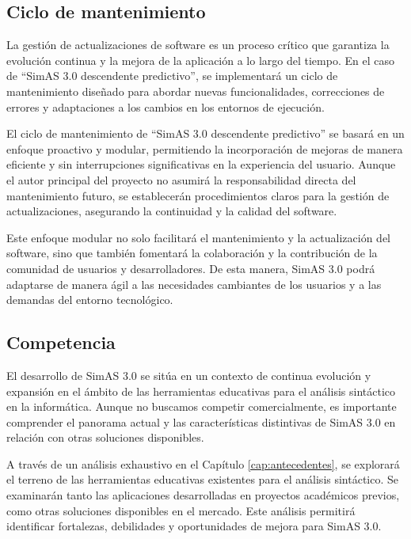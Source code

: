 \subsection{Ciclo de mantenimiento} \label{subsec:actualizaciones}

La gestión de actualizaciones de software es un proceso crítico que garantiza la evolución continua y la mejora de la aplicación a lo largo del tiempo. En el caso de ``SimAS 3.0 descendente predictivo'', se implementará un ciclo de mantenimiento diseñado para abordar nuevas funcionalidades, correcciones de errores y adaptaciones a los cambios en los entornos de ejecución.

El ciclo de mantenimiento de ``SimAS 3.0 descendente predictivo'' se basará en un enfoque proactivo y modular, permitiendo la incorporación de mejoras de manera eficiente y sin interrupciones significativas en la experiencia del usuario. Aunque el autor principal del proyecto no asumirá la responsabilidad directa del mantenimiento futuro, se establecerán procedimientos claros para la gestión de actualizaciones, asegurando la continuidad y la calidad del software.

Este enfoque modular no solo facilitará el mantenimiento y la actualización del software, sino que también fomentará la colaboración y la contribución de la comunidad de usuarios y desarrolladores. De esta manera, SimAS 3.0 podrá adaptarse de manera ágil a las necesidades cambiantes de los usuarios y a las demandas del entorno tecnológico.


\subsection{Competencia}

El desarrollo de SimAS 3.0 se sitúa en un contexto de continua evolución y expansión en el ámbito de las herramientas educativas para el análisis sintáctico en la informática. Aunque no buscamos competir comercialmente, es importante comprender el panorama actual y las características distintivas de SimAS 3.0 en relación con otras soluciones disponibles.

A través de un análisis exhaustivo en el Capítulo \ref{cap:antecedentes}, se explorará el terreno de las herramientas educativas existentes para el análisis sintáctico. Se examinarán tanto las aplicaciones desarrolladas en proyectos académicos previos, como otras soluciones disponibles en el mercado. Este análisis permitirá identificar fortalezas, debilidades y oportunidades de mejora para SimAS 3.0.

